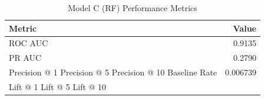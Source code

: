 \begin{table}[h]
\centering
\begin{tabular}{lr}
\toprule
Metric & Value \\
\midrule
ROC AUC & 0.9135 \\
PR AUC & 0.2790 \\
Precision @ 1%
Precision @ 5%
Precision @ 10%
Baseline Rate & 0.006739 \\
Lift @ 1%
Lift @ 5%
Lift @ 10%
\bottomrule
\end{tabular}
\caption{Model C (RF) Performance Metrics}
\label{tab:modelc_rf_metrics}
\end{table}
